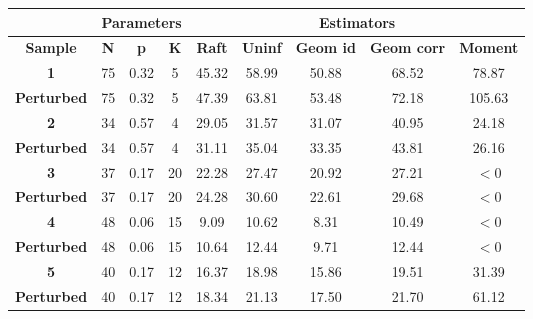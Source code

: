 \begin{table}[!ht]
    \centering
    \begin{tabular}{|c|c|c|c|c|c|c|c|c|}
        \hline
        \textbf{}          & \multicolumn{3}{c|}{\textbf{Parameters}} & \multicolumn{5}{c|}{\textbf{Estimators}}                                                 \\ \hline
        \textbf{Sample}    & \textbf{N}   & \textbf{p}  & \textbf{K}  & \textbf{Raft} & \textbf{Uninf} & \textbf{Geom id} & \textbf{Geom corr} & \textbf{Moment} \\ \hline
        \textbf{1}         & 75           & 0.32        & 5           & 45.32         & 58.99          & 50.88            & 68.52              & 78.87           \\ \hline
        \textbf{Perturbed} & 75           & 0.32        & 5           & 47.39         & 63.81          & 53.48            & 72.18              & 105.63          \\ \hline
        \textbf{2}         & 34           & 0.57        & 4           & 29.05         & 31.57          & 31.07            & 40.95              & 24.18           \\ \hline
        \textbf{Perturbed} & 34           & 0.57        & 4           & 31.11         & 35.04          & 33.35            & 43.81              & 26.16           \\ \hline
        \textbf{3}         & 37           & 0.17        & 20          & 22.28         & 27.47          & 20.92            & 27.21              & $< 0$     \\ \hline
        \textbf{Perturbed} & 37           & 0.17        & 20          & 24.28         & 30.60          & 22.61            & 29.68              & $< 0$   \\ \hline
        \textbf{4}         & 48           & 0.06        & 15          & 9.09          & 10.62          & 8.31             & 10.49              & $< 0$    \\ \hline
        \textbf{Perturbed} & 48           & 0.06        & 15          & 10.64         & 12.44          & 9.71             & 12.44              & $< 0$   \\ \hline
        \textbf{5}         & 40           & 0.17        & 12          & 16.37         & 18.98          & 15.86            & 19.51              & 31.39           \\ \hline
        \textbf{Perturbed} & 40           & 0.17        & 12          & 18.34         & 21.13          & 17.50            & 21.70              & 61.12           \\ \hline

\end{tabular}
\end{table}
